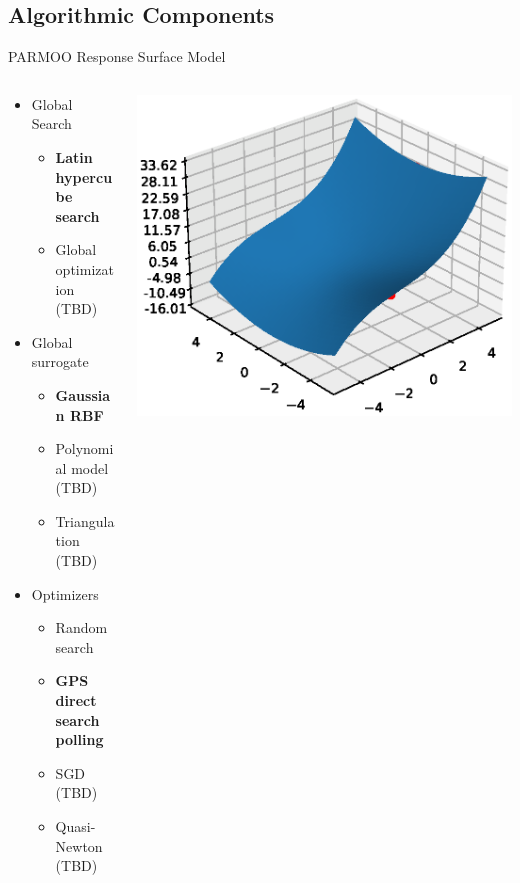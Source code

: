 \documentclass[aspectratio=169]{beamer}
\begin{document}
\subsection{Algorithmic Components}
\begin{frame}{PARMOO Response Surface Model}
\begin{columns}
\begin{column}{.4\textwidth}
\begin{itemize}
\item Global Search
\begin{itemize}
\item {\bf Latin hypercube search}
\item Global optimization (TBD)
\end{itemize}
\item Global surrogate
\begin{itemize}
\item {\bf Gaussian RBF}
\item Polynomial model (TBD)
\item Triangulation (TBD)
\end{itemize}
\item Optimizers
\begin{itemize}
\item Random search
\item {\bf GPS direct search polling}
\item SGD (TBD)
\item Quasi-Newton (TBD)
\end{itemize}
\end{itemize}
\end{column}
\begin{column}{.58\textwidth}
\includegraphics[width=\textwidth]{response_surface.eps}
\end{column}
\end{columns}
\end{frame}
\end{document}
